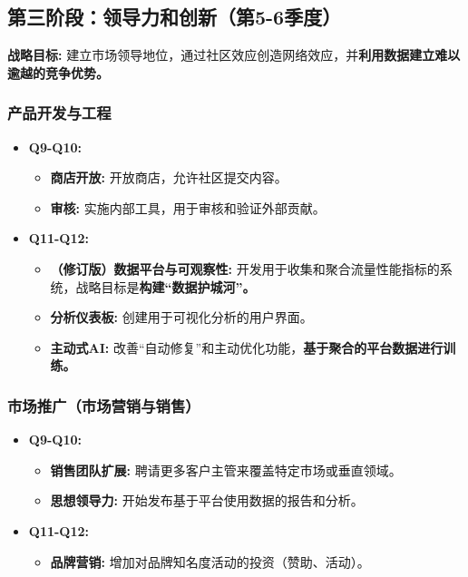 \documentclass[11pt, a4paper, oneside]{article}
\begin{document}
\subsection{第三阶段：领导力和创新（第5-6季度）}
\textbf{战略目标:} 建立市场领导地位，通过社区效应创造网络效应，并\textbf{利用数据建立难以逾越的竞争优势。}

\subsubsection{产品开发与工程}
\begin{itemize}[leftmargin=*]
    \item \textbf{Q9-Q10:}
    \begin{itemize}
        \item \textbf{商店开放:} 开放商店，允许社区提交内容。
        \item \textbf{审核:} 实施内部工具，用于审核和验证外部贡献。
    \end{itemize}
    \item \textbf{Q11-Q12:}
    \begin{itemize}
        \item \textbf{（修订版）数据平台与可观察性:} 开发用于收集和聚合流量性能指标的系统，战略目标是\textbf{构建“数据护城河”。}
        \item \textbf{分析仪表板:} 创建用于可视化分析的用户界面。
        \item \textbf{主动式AI:} 改善“自动修复”和主动优化功能，\textbf{基于聚合的平台数据进行训练。}
    \end{itemize}
\end{itemize}

\subsubsection{市场推广（市场营销与销售）}
\begin{itemize}[leftmargin=*]
    \item \textbf{Q9-Q10:}
    \begin{itemize}
        \item \textbf{销售团队扩展:} 聘请更多客户主管来覆盖特定市场或垂直领域。
        \item \textbf{思想领导力:} 开始发布基于平台使用数据的报告和分析。
    \end{itemize}
    \item \textbf{Q11-Q12:}
    \begin{itemize}
        \item \textbf{品牌营销:} 增加对品牌知名度活动的投资（赞助、活动）。
    \end{itemize}
\end{itemize}
\end{document}
